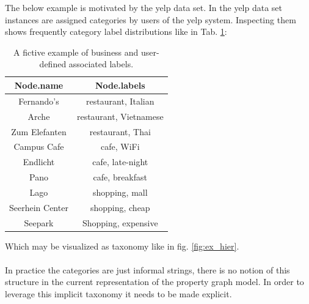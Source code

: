 The below example is motivated by the yelp data set. In the yelp data set instances are assigned categories by users of the yelp system. Inspecting them shows frequently category label distributions like in Tab. \ref{tab:running_ex}: \\
\begin{table}[htp]
     \centering
     \begin{tabular}{c c} \toprule
            Node.name & Node.labels \\ \midrule
            Fernando's & restaurant, Italian \\ 
            Arche & restaurant, Vietnamese \\ 
            Zum Elefanten & restaurant, Thai \\ 
            Campus Cafe & cafe, WiFi \\ 
            Endlicht & cafe, late-night \\ 
            Pano & cafe, breakfast \\
            Lago & shopping, mall \\ 
            Seerhein Center & shopping, cheap \\ 
            Seepark & Shopping, expensive \\ \bottomrule
        \end{tabular}
    \caption{A fictive example of business and user-defined associated labels.}
    \label{tab:running_ex}
\end{table}{}
Which may be visualized as taxonomy like in fig. \ref{fig:ex_hier}. \\
 \\
 In practice the categories are just informal strings, there is no notion of this structure in the current representation of the property graph model. In order to leverage this implicit taxonomy it needs to be made explicit. \\
 
